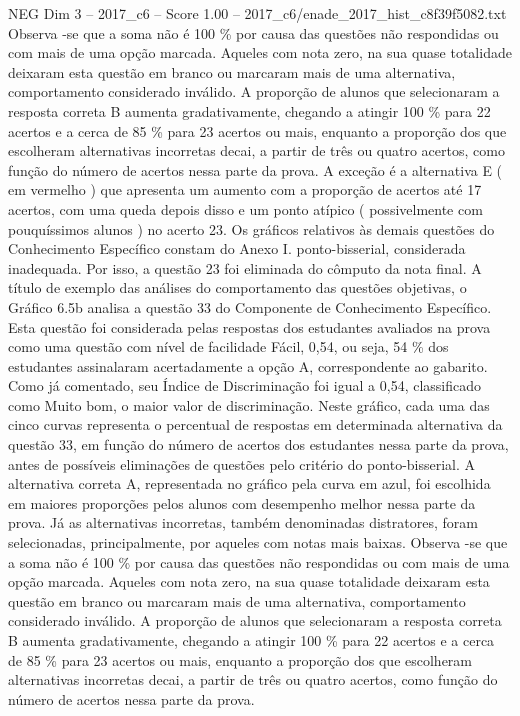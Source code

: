 \begin{textsample}{NEG Dim 3 – 2017\_c6 – Score 1.00 – 2017\_c6/enade\_2017\_hist\_c8f39f5082.txt}
Observa -se que a soma não é 100 \% por causa das questões não respondidas ou com mais de uma opção marcada.
Aqueles com nota zero, na sua quase totalidade deixaram esta questão em branco ou marcaram mais de uma alternativa, comportamento considerado inválido.
A proporção de alunos que selecionaram a resposta correta B aumenta gradativamente, chegando a atingir 100 \% para 22 acertos e a cerca de 85 \% para 23 acertos ou mais, enquanto a proporção dos que escolheram alternativas incorretas decai, a partir de três ou quatro acertos, como função do número de acertos nessa parte da prova.
A exceção é a alternativa E ( em vermelho ) que apresenta um aumento com a proporção de acertos até 17 acertos, com uma queda depois disso e um ponto atípico ( possivelmente com pouquíssimos alunos ) no acerto 23.
Os gráficos relativos às demais questões do Conhecimento Específico constam do Anexo I. ponto-bisserial, considerada inadequada.
Por isso, a questão 23 foi eliminada do cômputo da nota final.
A título de exemplo das análises do comportamento das questões objetivas, o Gráfico 6.5b analisa a questão 33 do Componente de Conhecimento Específico.
Esta questão foi considerada pelas respostas dos estudantes avaliados na prova como uma questão com nível de facilidade Fácil, 0,54, ou seja, 54 \% dos estudantes assinalaram acertadamente a opção A, correspondente ao gabarito.
Como já comentado, seu Índice de Discriminação foi igual a 0,54, classificado como Muito bom, o maior valor de discriminação.
Neste gráfico, cada uma das cinco curvas representa o percentual de respostas em determinada alternativa da questão 33, em função do número de acertos dos estudantes nessa parte da prova, antes de possíveis eliminações de questões pelo critério do ponto-bisserial.
A alternativa correta A, representada no gráfico pela curva em azul, foi escolhida em maiores proporções pelos alunos com desempenho melhor nessa parte da prova.
Já as alternativas incorretas, também denominadas distratores, foram selecionadas, principalmente, por aqueles com notas mais baixas.
Observa -se que a soma não é 100 \% por causa das questões não respondidas ou com mais de uma opção marcada.
Aqueles com nota zero, na sua quase totalidade deixaram esta questão em branco ou marcaram mais de uma alternativa, comportamento considerado inválido.
A proporção de alunos que selecionaram a resposta correta B aumenta gradativamente, chegando a atingir 100 \% para 22 acertos e a cerca de 85 \% para 23 acertos ou mais, enquanto a proporção dos que escolheram alternativas incorretas decai, a partir de três ou quatro acertos, como função do número de acertos nessa parte da prova.

\end{textsample}
